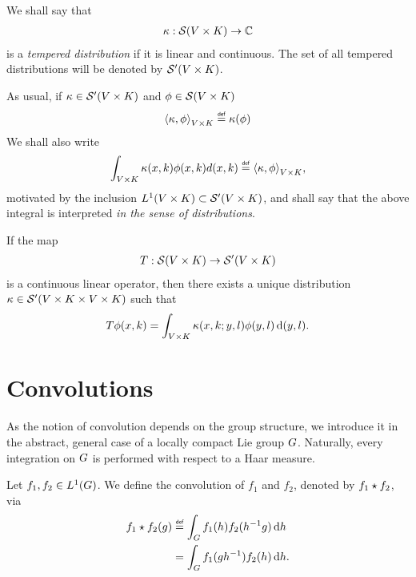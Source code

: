 \begin{definition}
    We shall say that
    \begin{align*}
        \kappa : {\mathcal{S} (V \times K)} \to \mathbb{C}
    \end{align*}
    is a \emph{tempered distribution} if it is linear and continuous.
    The set of all tempered distributions will be denoted by ${\mathcal{S}' (V \times K)}$.
\end{definition}

As usual, if $\kappa \in {\mathcal{S}' (V\times K)}$ and $\phi \in {\mathcal{S} (V\times K)}$
\begin{align*}
    \dualBracket [\GroupDirect] \kappa \phi \defeq \kappa(\phi)
\end{align*}
We shall also write
\begin{align*}
    \int_{\GroupDirect} \kappa(x, k) \phi(x, k) d(x, k) \defeq \dualBracket [\GroupDirect] \kappa \phi,
\end{align*}
motivated by the inclusion ${L^{1} (V \times K)} \subset {\mathcal{S}' (V\times K)}$,
and shall say that the above integral is interpreted \emph{in the sense of distributions}.

\begin{theorem}
\label{theorem:Schwartz_Kernel_Theorem}
    If the map
    \begin{align*}
        T : {\mathcal{S} (V \times K)} \to {\mathcal{S}' (V\times K)}
    \end{align*}
    is a continuous linear operator,
    then there exists a unique distribution
    $\kappa \in {\mathcal{S}' (V\times K\times V\times K)}$ such that
    \begin{align*}
        T \phi(x, k) = \int_{V \times K} \kappa(x, k; y, l) \phi(y, l) \,\mathrm{d} (y, l).
    \end{align*}
\end{theorem}

\section{Convolutions}

As the notion of convolution depends on the group structure,
we introduce it in the abstract, general case of a locally compact Lie group $G$.
Naturally, every integration on $G$ is performed with respect to a Haar measure.

\begin{definition}[Convolution]
    Let $f_1, f_2 \in {L^{1} (G)}$.
    We define the convolution of $f_1$ and $f_2$,
    denoted by $f_1 \star f_2$, via
    \begin{align}
        \conv {f_1} {f_2} (g)
        &\defeq \int_\Group f_1(h) f_2(h^{-1} g) \dd h
        \label{eq:definition_of_convolution}\\
        &= \int_\Group f_1(g h^{-1}) f_2(h) \dd h.
        \label{eq:alternative_definition_of_convolution}
    \end{align}
\end{definition}

